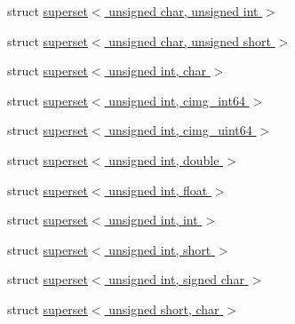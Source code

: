 \begin{DoxyCompactItemize}
\item 
struct \hyperlink{namespacecimg__library__suffixed_1_1cimg_d5/d81/structcimg__library__suffixed_1_1cimg_1_1superset_3_01unsigned_01char_00_01unsigned_01int_01_4}{superset$<$ unsigned char, unsigned int $>$}
\item 
struct \hyperlink{namespacecimg__library__suffixed_1_1cimg_d2/d89/structcimg__library__suffixed_1_1cimg_1_1superset_3_01unsigned_01char_00_01unsigned_01short_01_4}{superset$<$ unsigned char, unsigned short $>$}
\item 
struct \hyperlink{namespacecimg__library__suffixed_1_1cimg_d6/d8f/structcimg__library__suffixed_1_1cimg_1_1superset_3_01unsigned_01int_00_01char_01_4}{superset$<$ unsigned int, char $>$}
\item 
struct \hyperlink{namespacecimg__library__suffixed_1_1cimg_dc/dcc/structcimg__library__suffixed_1_1cimg_1_1superset_3_01unsigned_01int_00_01cimg__int64_01_4}{superset$<$ unsigned int, cimg\+\_\+int64 $>$}
\item 
struct \hyperlink{namespacecimg__library__suffixed_1_1cimg_d0/dcc/structcimg__library__suffixed_1_1cimg_1_1superset_3_01unsigned_01int_00_01cimg__uint64_01_4}{superset$<$ unsigned int, cimg\+\_\+uint64 $>$}
\item 
struct \hyperlink{namespacecimg__library__suffixed_1_1cimg_df/de3/structcimg__library__suffixed_1_1cimg_1_1superset_3_01unsigned_01int_00_01double_01_4}{superset$<$ unsigned int, double $>$}
\item 
struct \hyperlink{namespacecimg__library__suffixed_1_1cimg_db/d17/structcimg__library__suffixed_1_1cimg_1_1superset_3_01unsigned_01int_00_01float_01_4}{superset$<$ unsigned int, float $>$}
\item 
struct \hyperlink{namespacecimg__library__suffixed_1_1cimg_d1/d7d/structcimg__library__suffixed_1_1cimg_1_1superset_3_01unsigned_01int_00_01int_01_4}{superset$<$ unsigned int, int $>$}
\item 
struct \hyperlink{namespacecimg__library__suffixed_1_1cimg_d7/d3b/structcimg__library__suffixed_1_1cimg_1_1superset_3_01unsigned_01int_00_01short_01_4}{superset$<$ unsigned int, short $>$}
\item 
struct \hyperlink{namespacecimg__library__suffixed_1_1cimg_df/d88/structcimg__library__suffixed_1_1cimg_1_1superset_3_01unsigned_01int_00_01signed_01char_01_4}{superset$<$ unsigned int, signed char $>$}
\item 
struct \hyperlink{namespacecimg__library__suffixed_1_1cimg_db/d9b/structcimg__library__suffixed_1_1cimg_1_1superset_3_01unsigned_01short_00_01char_01_4}{superset$<$ unsigned short, char $>$}

\end{DoxyCompactItemize}
